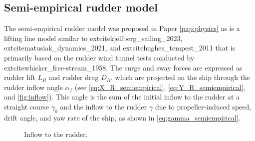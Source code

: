 \subsection{Semi-empirical rudder model} \label{sec:semi-empirical}
The semi-empirical rudder model was proposed in Paper \ref{pap:physics}  as is a lifting line model similar to 	extcite{kjellberg_sailing_2023}, 	extcite{matusiak_dynamics_2021}, and 	extcite{hughes_tempest_2011} that is primarily based on the rudder wind tunnel tests conducted by 	extcite{whicker_free-stream_1958}. The surge and sway forces are expressed as rudder lift $L_R$ and rudder drag $D_R$, which are projected on the ship through the rudder inflow angle $\alpha_f$ (see \autoref{eq:X_R_semiempirical}, \autoref{eq:Y_R_semiempirical}, and \autoref{fig:inflow}).
This angle is the sum of the initial inflow to the rudder at a straight course $\gamma_0$ and the inflow to the rudder $\gamma$ due to propeller-induced speed, drift angle, and yaw rate of the ship, as shown in \autoref{eq:gamma_semiempirical}.
%
\begin{figure}[h]
    \centering
    
    \caption{Inflow to the rudder.}
    \label{fig:inflow}
\end{figure}
%
\begin{equation}
    \label{eq:X_R_semiempirical}
    
\end{equation}
%
\begin{equation}
    \label{eq:Y_R_semiempirical}
    
\end{equation}
%
\begin{equation}
    \label{eq:alpha_f_semiempirical}
    
\end{equation}
%
\begin{equation}
    \label{eq:gamma_semiempirical}
    
\end{equation}

